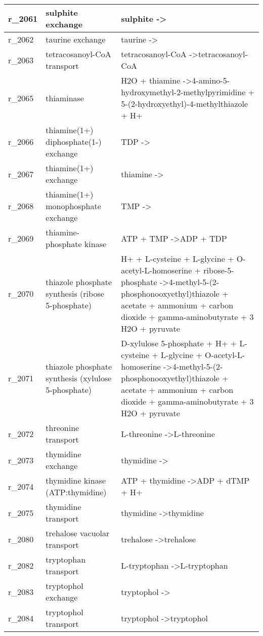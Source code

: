 \begin{landscape}
{\begin{longtable}{|l|p{7cm}|p{15cm}|}
r\_2061 & sulphite exchange & sulphite  -\textgreater{} \\ \hline
r\_2062 & taurine exchange & taurine  -\textgreater{} \\ \hline
r\_2063 & tetracosanoyl-CoA transport & tetracosanoyl-CoA  -\textgreater tetracosanoyl-CoA \\ \hline
r\_2065 & thiaminase & H2O + thiamine  -\textgreater 4-amino-5-hydroxymethyl-2-methylpyrimidine + 5-(2-hydroxyethyl)-4-methylthiazole + H+ \\ \hline
r\_2066 & thiamine(1+) diphosphate(1-) exchange & TDP  -\textgreater{} \\ \hline
r\_2067 & thiamine(1+) exchange & thiamine  -\textgreater{} \\ \hline
r\_2068 & thiamine(1+) monophosphate exchange & TMP  -\textgreater{} \\ \hline
r\_2069 & thiamine-phosphate kinase & ATP + TMP  -\textgreater ADP + TDP \\ \hline
r\_2070 & thiazole phosphate synthesis (ribose 5-phosphate) & H+ + L-cysteine + L-glycine + O-acetyl-L-homoserine + ribose-5-phosphate  -\textgreater 4-methyl-5-(2-phosphonooxyethyl)thiazole + acetate + ammonium + carbon dioxide + gamma-aminobutyrate + 3 H2O + pyruvate \\ \hline
r\_2071 & thiazole phosphate synthesis (xylulose 5-phosphate) & D-xylulose 5-phosphate + H+ + L-cysteine + L-glycine + O-acetyl-L-homoserine  -\textgreater 4-methyl-5-(2-phosphonooxyethyl)thiazole + acetate + ammonium + carbon dioxide + gamma-aminobutyrate + 3 H2O + pyruvate \\ \hline
r\_2072 & threonine transport & L-threonine  -\textgreater L-threonine \\ \hline
r\_2073 & thymidine exchange & thymidine  -\textgreater{} \\ \hline
r\_2074 & thymidine kinase (ATP:thymidine) & ATP + thymidine  -\textgreater ADP + dTMP + H+ \\ \hline
r\_2075 & thymidine transport & thymidine  -\textgreater thymidine \\ \hline
r\_2080 & trehalose vacuolar transport & trehalose  -\textgreater trehalose \\ \hline
r\_2082 & tryptophan transport & L-tryptophan  -\textgreater L-tryptophan \\ \hline
r\_2083 & tryptophol exchange & tryptophol  -\textgreater{} \\ \hline
r\_2084 & tryptophol transport & tryptophol  -\textgreater tryptophol \\ \hline

\end{longtable}}
\end{landscape}

